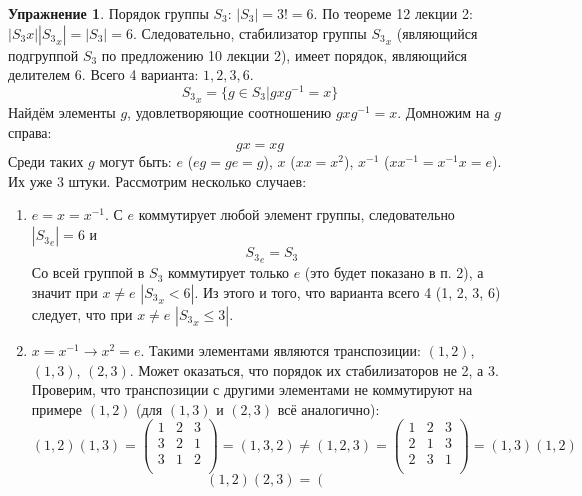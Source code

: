 \documentclass[12pt]{article}
\theoremstyle{definition}
\newtheorem{upr}[zad]{Упражнение}
\begin{document}
\begin{upr}
Порядок группы $S_3$: $|S_3|=3!=6$. По теореме 12 лекции 2: $|S_3x||{S_3}_x|=|S_3|=6$. Следовательно, стабилизатор группы ${S_3}_x$ (являющийся подгруппой $S_3$ по предложению 10 лекции 2), имеет порядок, являющийся делителем 6. Всего 4 варианта: $1, 2, 3, 6$.
\begin{equation}
    {S_3}_x=\{g\in S_3|gxg^{-1}=x\}
\end{equation}
Найдём элементы $g$, удовлетворяющие соотношению $gxg^{-1}=x$. Домножим на $g$ справа:
\begin{equation}
    gx=xg
\end{equation}
Среди таких $g$ могут быть: $e$ ($eg=ge=g$), $x$ ($xx=x^2$), $x^{-1}$ ($xx^{-1}=x^{-1}x=e$). Их уже 3 штуки. Рассмотрим несколько случаев:
\begin{enumerate}
    \item $e=x=x^{-1}$. С $e$ коммутирует любой элемент группы, следовательно $|{S_3}_e|=6$ и \begin{equation}
        \boxed{{S_3}_e=S_3}
    \end{equation} 
    Со всей группой в $S_3$ коммутирует только $e$ (это будет показано в п. 2), а значит при $x\neq e$ $|{S_3}_x<6|$. Из этого и того, что варианта всего 4 (1, 2, 3, 6) следует, что при $x\neq e$ $|{S_3}_x\leq 3|$.
    \item $x=x^{-1}\rightarrow x^2=e$. Такими элементами являются транспозиции: $(1,2)$, $(1,3)$, $(2,3)$. Может оказаться, что порядок их стабилизаторов не 2, а 3. Проверим, что транспозиции с другими элементами не коммутируют на примере $(1,2)$ (для $(1,3)$ и $(2,3)$ всё аналогично):
    \begin{equation}
        (1,2)(1,3)=\left(
    \begin{array}{ccc}
    1 & 2 & 3\\
    3 & 2 & 1\\
    3 & 1 & 2\\
    \end{array}
    \right)=(1,3,2)\neq (1,2,3)=\left(
    \begin{array}{ccc}
    1 & 2 & 3\\
    2 & 1 & 3\\
    2 & 3 & 1\\
    \end{array}
    \right)=(1,3)(1,2)
    \end{equation}
    \begin{equation}
        (1,2)(2,3)=\left(
    \begin{array}{ccc}

\end{array}
\end{equation}
\end{enumerate}
\end{upr}
\end{document}
